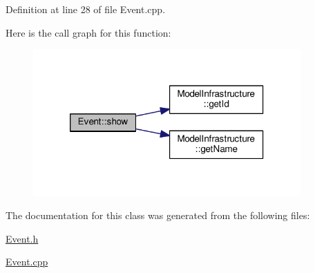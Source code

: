 Definition at line 28 of file Event.\-cpp.



Here is the call graph for this function\-:\nopagebreak
\begin{figure}[H]
\begin{center}
\leavevmode
\includegraphics[width=290pt]{class_event_a640f132001d454af52cb0d0e20ebb856_cgraph}
\end{center}
\end{figure}




The documentation for this class was generated from the following files\-:\begin{DoxyCompactItemize}
\item 
\hyperlink{_event_8h}{Event.\-h}\item 
\hyperlink{_event_8cpp}{Event.\-cpp}\end{DoxyCompactItemize}
